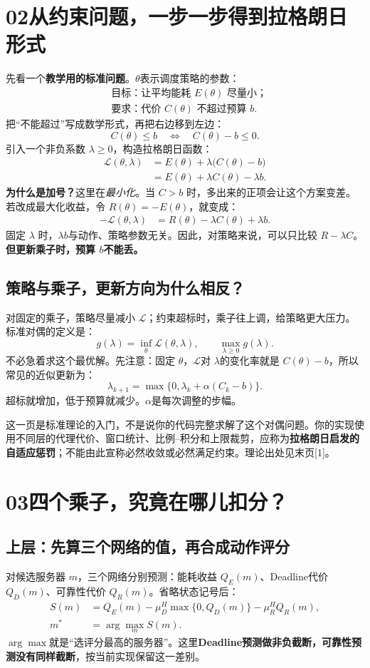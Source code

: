 \documentclass[UTF8,11pt,a4paper,fontset=fandol]{ctexart}
\newcommand{\lesson}[2]{\section*{#1\quad #2}}
\begin{document}
\newpage
\lesson{02}{从约束问题，一步一步得到拉格朗日形式}
先看一个\textbf{教学用的标准问题}。$\theta$表示调度策略的参数：
\begin{align*}
&\text{目标：让平均能耗 } E(\theta) \text{ 尽量小；}\\
&\text{要求：代价 } C(\theta)\text{ 不超过预算 }b.
\end{align*}
把“不能超过”写成数学形式，再把右边移到左边：
\[
 C(\theta)\le b
 \quad\Longleftrightarrow\quad
 C(\theta)-b\le0.
\]
引入一个非负系数 $\lambda\ge0$，构造拉格朗日函数：
\begin{align*}
\mathcal L(\theta,\lambda)
 &= E(\theta)+\lambda\big(C(\theta)-b\big)\\
 &= E(\theta)+\lambda C(\theta)-\lambda b.
\end{align*}
\textbf{为什么是加号？}这里在\emph{最小化}。当 $C>b$ 时，多出来的正项会让这个方案变差。若改成最大化收益，令 $R(\theta)=-E(\theta)$，就变成：
\begin{align*}
-\mathcal L(\theta,\lambda)
 &=R(\theta)-\lambda C(\theta)+\lambda b.
\end{align*}
固定 $\lambda$ 时，$\lambda b$与动作、策略参数无关。因此，对策略来说，可以只比较 $R-\lambda C$。\textbf{但更新乘子时，预算 $b$不能丢。}

\subsection*{策略与乘子，更新方向为什么相反？}
对固定的乘子，策略尽量减小 $\mathcal L$；约束超标时，乘子往上调，给策略更大压力。标准对偶的定义是：
\[
g(\lambda)=\inf_\theta\mathcal L(\theta,\lambda),
\qquad \max_{\lambda\ge0}g(\lambda).
\]
不必急着求这个最优解。先注意：固定 $\theta$，$\mathcal L$对 $\lambda$的变化率就是 $C(\theta)-b$，所以常见的近似更新为：
\[
\lambda_{k+1}=\max\{0,\lambda_k+\alpha(C_k-b)\}.
\]
超标就增加，低于预算就减少。$\alpha$是每次调整的步幅。
\begin{remember}
这一页是标准理论的入门，不是说你的代码完整求解了这个对偶问题。你的实现使用不同层的代理代价、窗口统计、比例--积分和上限裁剪，应称为\textbf{拉格朗日启发的自适应惩罚}；不能由此宣称必然收敛或必然满足约束。理论出处见末页[1]。
\end{remember}

\newpage
\lesson{03}{四个乘子，究竟在哪儿扣分？}
\subsection*{上层：先算三个网络的值，再合成动作评分}
对候选服务器 $m$，三个网络分别预测：能耗收益 $Q_E(m)$、Deadline代价 $Q_D(m)$、可靠性代价 $Q_R(m)$。省略状态记号后：
\begin{align*}
S(m) &= Q_E(m)-\mu_D^H\max\{0,Q_D(m)\}-\mu_R^H Q_R(m),\\
m^* &=\arg\max_m S(m).
\end{align*}
$\arg\max$就是“选评分最高的服务器”。这里\textbf{Deadline预测做非负截断，可靠性预测没有同样截断}，按当前实现保留这一差别。
\end{document}
